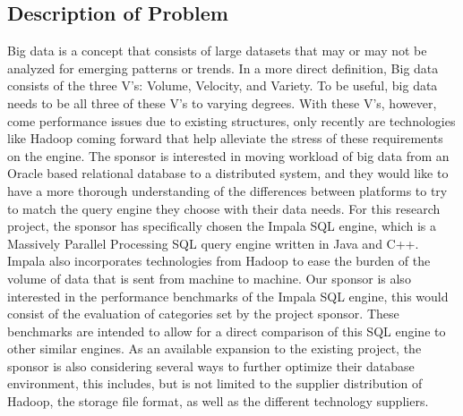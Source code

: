 \documentclass[letterpaper,10pt,fleqn,draftclsnofoot,onecolumn]{IEEEtran}
\begin{document}
	\subsection{\textbf{Description of Problem}}
	\indent Big data is a concept that consists of large datasets that may or may not be analyzed for emerging patterns or trends. In a more direct definition, Big data consists of the three V’s: Volume, Velocity, and Variety. To be useful, big data needs to be all three of these V’s to varying degrees. With these V’s, however, come performance issues due to existing structures, only recently are technologies like Hadoop coming forward that help alleviate the stress of these requirements on the engine.\newline\newline
	\indent The sponsor is interested in moving workload of big data from an Oracle based relational database to a distributed system, and they would like to have a more thorough understanding of the differences between platforms to try to match the query engine they choose with their data needs. For this research project, the sponsor has specifically chosen the Impala SQL engine, which is a Massively Parallel Processing SQL query engine written in Java and C++.  Impala also incorporates technologies from Hadoop to ease the burden of the volume of data that is sent from machine to machine.\newline\newline 
	\indent Our sponsor is also interested in the performance benchmarks of the Impala SQL engine, this would consist of the evaluation of categories set by the project sponsor. These benchmarks are intended to allow for a direct comparison of this SQL engine to other similar engines. \newline\newline
	\indent As an available expansion to the existing project, the sponsor is also considering several ways to further optimize their database environment, this includes, but is not limited to the supplier distribution of Hadoop, the storage file format, as well as the different technology suppliers.
	
	
\end{document}
